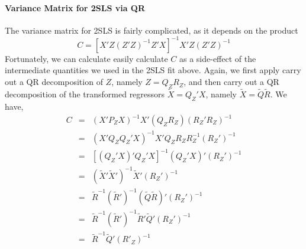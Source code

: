 \documentclass[12pt]{article}
\theoremstyle{definition}
\begin{document}
\paragraph{Variance Matrix for 2SLS via QR}
The variance matrix for 2SLS is fairly complicated, as it depends on the product
  $$C = \left[X'Z(Z'Z)^{-1}Z'X\right]^{-1} X'Z (Z'Z)^{-1}$$
Fortunately, we can calculate easily calculate $C$ as a side-effect of the intermediate quantities we used in the 2SLS fit above. Again, we first apply carry out a QR decomposition of $Z$, namely $Z = Q_Z R_Z$,  and then carry out a QR decomposition of the transformed regressors $\widetilde{X} = Q_Z' X$, namely $\widetilde{X} = \widetilde{Q} \widetilde{R}$. We have,
  \begin{eqnarray*}
    C &=& \left(X' P_Z X \right)^{-1} X'(Q_Z R_Z) \left(R_Z' R_Z\right)^{-1}\\
      &=& \left(X' Q_Z Q_Z' X \right)^{-1} X'Q_Z R_Z R_Z^{-1} (R_Z')^{-1}\\
      &=& \left[ (Q_Z' X)' Q_Z'X \right]^{-1} (Q_Z' X)' (R_Z')^{-1}\\
      &=& \left(\widetilde{X}' \widetilde{X}' \right)^{-1} \widetilde{X}' (R_Z')^{-1}\\
      &=& \widetilde{R}^{-1} (\widetilde{R}')^{-1} (\widetilde{Q} \widetilde{R})' (R_Z')^{-1}\\
      &=& \widetilde{R}^{-1} (\widetilde{R}')^{-1} \widetilde{R}' \widetilde{Q}' (R_Z')^{-1}\\
      &=& \widetilde{R}^{-1}\widetilde{Q}' (R'_Z)^{-1}
  \end{eqnarray*}
\end{document}
